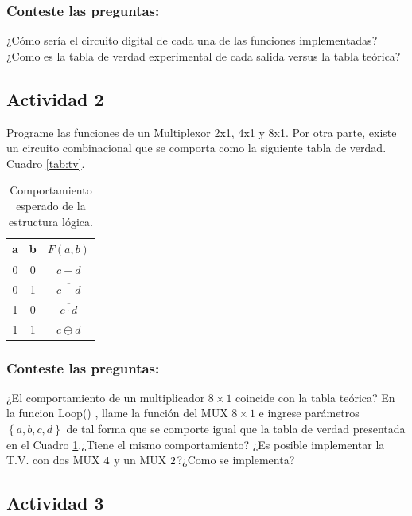  
\subsubsection{Conteste las preguntas:}

¿Cómo sería el circuito digital de cada una de las funciones implementadas?
¿Como es la tabla de verdad experimental de cada salida versus la tabla teórica?


\subsection{Actividad 2}

Programe las funciones de un Multiplexor 2x1, 4x1 y 8x1.
Por otra parte, existe un circuito  combinacional que se comporta como la siguiente tabla de verdad. Cuadro \eqref{tab:tv}.

\begin{table}[H]
\centering
\caption{Comportamiento esperado de la estructura lógica.}
\label{tab:tv}
\begin{tabular}{|c|c|c|}

	\hline 
	a 	& b  & $F(a,b)$  \\ 
	\hline 
 	0	& 0 &  $c + d$\\ 

	0	& 1 &  $\overline{c + d}$\\ 

	1	& 0 &  $\overline{c \cdot d}$\\ 

	1	& 1 &  $c \oplus d$\\ 
	\hline 
\end{tabular} 

\end{table}

\subsubsection{Conteste las preguntas:}

¿El comportamiento de un multiplicador $8 \times 1$ coincide con la tabla teórica?
En la funcion Loop() , llame la función del MUX  $8 \times 1$ e ingrese parámetros $\left\lbrace a,b,c,d \right\rbrace $ de tal forma que se comporte igual que la tabla de verdad presentada en el Cuadro \ref{tab:tv}.¿Tiene el mismo comportamiento?
¿Es posible implementar la T.V. con dos MUX $4 \time 1$ y un MUX  $2 \time 1$?¿Como se implementa?

\subsection{Actividad 3}

